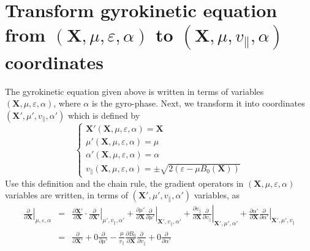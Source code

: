 \documentclass{llncs}
\begin{document}
\

\

\section{Transform gyrokinetic equation from $(\mathbf{X}, \mu, \varepsilon,
\alpha)$ to $(\mathbf{X}, \mu, v_{\parallel}, \alpha)$ coordinates}

The gyrokinetic equation given above is written in terms of variables
$(\mathbf{X}, \mu, \varepsilon, \alpha)$, where $\alpha$ is the gyro-phase.
Next, we transform it into coordinates $(\mathbf{X}', \mu', v_{\parallel},
\alpha')$ which is defined by
\begin{equation}
  \left\{ \begin{array}{l}
    \mathbf{X}' (\mathbf{X}, \mu, \varepsilon, \alpha) =\mathbf{X}\\
    \mu' (\mathbf{X}, \mu, \varepsilon, \alpha) = \mu\\
    \alpha' (\mathbf{X}, \mu, \varepsilon, \alpha) = \alpha\\
    v_{\parallel} (\mathbf{X}, \mu, \varepsilon, \alpha) = \pm \sqrt{2
    (\varepsilon - \mu B_0 (\mathbf{X}))}
  \end{array} \right.
\end{equation}
Use this definition and the chain rule, the gradient operators in
$(\mathbf{X}, \mu, \varepsilon, \alpha)$ variables are written, in terms of
$(\mathbf{X}', \mu', v_{\parallel}, \alpha')$ variables, as
\begin{eqnarray}
  \left. \frac{\partial}{\partial \mathbf{X}} \right|_{\mu, \varepsilon,
  \alpha} & = & \frac{\partial \mathbf{X}'}{\partial \mathbf{X}} \cdot \left.
  \frac{\partial}{\partial \mathbf{X}'} \right|_{\mu', v_{\parallel}, \alpha'}
  + \frac{\partial \mu'}{\partial \mathbf{X}}  \left. \frac{\partial}{\partial
  \mu'} \right|_{\mathbf{X}', v_{\parallel}, \alpha'} + \frac{\partial
  v_{\parallel}}{\partial \mathbf{X}}  \left. \frac{\partial}{\partial
  v_{\parallel}} \right|_{\mathbf{X}', \mu', \alpha'} + \frac{\partial \alpha'
  }{\partial \mathbf{X}}  \left. \frac{\partial}{\partial \alpha'}
  \right|_{\mathbf{X}', \mu', v_{\parallel}} \nonumber\\
  & = & \frac{\partial}{\partial \mathbf{X}'} + 0 \frac{\partial}{\partial
  \mu'} - \frac{\mu}{v_{\parallel}}  \frac{\partial B_0}{\partial \mathbf{X}} 
  \frac{\partial}{\partial v_{\parallel}} + 0 \frac{\partial}{\partial
  \alpha'}  \label{19-1-2-e1}
\end{eqnarray}
\end{document}
